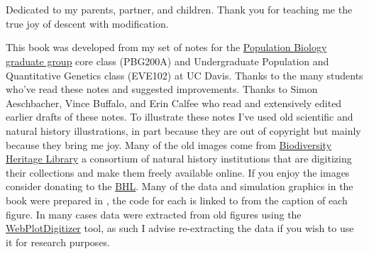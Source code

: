 \documentclass{tufte-book}
\begin{document}
\begin{fullwidth}
~\vfill
\thispagestyle{empty}

~\vfill
\begin{doublespace}
\noindent\fontsize{16}{18}\selectfont\itshape   %
\nohyphenation
\begin{center}
Dedicated to my parents, partner, and children. Thank you for teaching me the
true joy of descent with modification.
\end{center}
\end{doublespace}
\vfill
\vfill

\setlength{\parindent}{0pt}
\setlength{\parskip}{\baselineskip}
  \small This book was developed from my set of notes for the \href{http://www-eve.ucdavis.edu/eve/pbg/}{Population
  Biology graduate group} core class (PBG200A) and Undergraduate Population and
  Quantitative Genetics class (EVE102) at UC Davis. Thanks to the many
  students who've read these notes and suggested improvements. Thanks
 to Simon Aeschbacher, Vince Buffalo, and Erin Calfee who read
 and extensively edited earlier drafts of these notes. To illustrate these notes I've used old scientific and natural history illustrations, in part
 because they are out of copyright but mainly because they bring me
 joy. Many of the old images come from
 \href{https://www.biodiversitylibrary.org/}{Biodiversity Heritage
   Library} a consortium of natural history institutions that are
 digitizing their collections and make them freely available
 online. If you enjoy the images consider donating to the
 \href{http://library.si.edu/donate-bhl}{BHL}. Many of the data and
 simulation graphics in the book were prepared in \citet{Rstats},
 the code for each is linked to from the caption of each figure. In many cases
 data were extracted from old figures using the
 \href{https://automeris.io/WebPlotDigitizer/}{WebPlotDigitizer}
 tool, as such I advise re-extracting the data if you wish to use it
 for research purposes.
\end{fullwidth}

\tableofcontents














%


\end{document}
